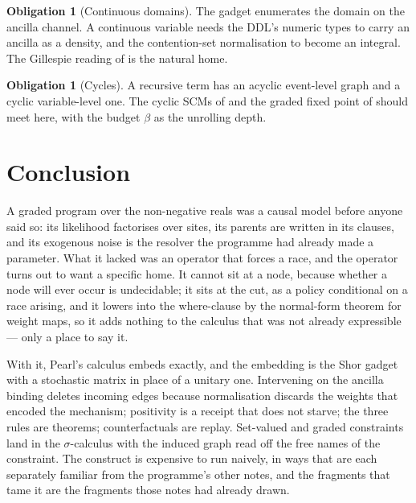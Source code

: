 \documentclass[11pt,a4paper]{article}
\theoremstyle{plain}
\theoremstyle{definition}
\newtheorem{obligation}[theorem]{Obligation}
\theoremstyle{remark}
\begin{document}
\begin{obligation}[Continuous domains]\label{ob:continuous}
The gadget enumerates the domain on the ancilla channel. A continuous variable
needs the DDL's numeric types to carry an ancilla as a density, and the
contention-set normalisation to become an integral. The Gillespie reading of
\cite{WeightedGSLT} is the natural home.
\end{obligation}

\begin{obligation}[Cycles]\label{ob:cycles}
A recursive term has an acyclic event-level graph and a cyclic variable-level
one. The cyclic SCMs of \cite{BongersEtAl} and the graded fixed point of
\cite{GradedPLN} should meet here, with the budget $\beta$ as the unrolling
depth.
\end{obligation}

\section{Conclusion}\label{sec:conc}

A graded program over the non-negative reals was a causal model before anyone
said so: its likelihood factorises over sites, its parents are written in its
clauses, and its exogenous noise is the resolver the programme had already made
a parameter. What it lacked was an operator that forces a race, and the operator
turns out to want a specific home. It cannot sit at a node, because whether a
node will ever occur is undecidable; it sits at the cut, as a policy conditional
on a race arising, and it lowers into the where-clause by the normal-form
theorem for weight maps, so it adds nothing to the calculus that was not already
expressible --- only a place to say it.

With it, Pearl's calculus embeds exactly, and the embedding is the Shor gadget
with a stochastic matrix in place of a unitary one. Intervening on the ancilla
binding deletes incoming edges because normalisation discards the weights that
encoded the mechanism; positivity is a receipt that does not starve; the three
rules are theorems; counterfactuals are replay. Set-valued and graded
constraints land in the $\sigma$-calculus with the induced graph read off the
free names of the constraint. The construct is expensive to run naively, in
ways that are each separately familiar from the programme's other notes, and
the fragments that tame it are the fragments those notes had already drawn.
\end{document}
